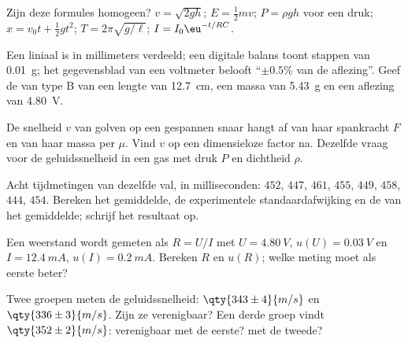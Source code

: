 \begin{exercise}[$\star$]\label{exo:b1:units-dimensions:3}
Zijn deze formules homogeen? $v = \sqrt{2gh}$;
$E = \tfrac12 m v$; $P = \rho g h$ voor een druk; $x = v_0 t +
\tfrac12 g t^2$; $T = 2\pi\sqrt{g/\ell}$; $I = I_0 \eu^{-t/RC}$.
\end{exercise}

\begin{exercise}[$\star$]\label{exo:b1:units-dimensions:4}
Een liniaal is in millimeters verdeeld; een digitale balans toont stappen van
\qty{0.01}{g}; het gegevensblad van een voltmeter belooft ``$\pm 0.5\%$ van
de aflezing''. Geef de  van type B van een lengte van
\qty{12.7}{cm}, een massa van \qty{5.43}{g} en een aflezing van \qty{4.80}{V}.
\end{exercise}

\begin{exercise}[$\star\star$]\label{exo:b1:units-dimensions:5}
De snelheid $v$ van golven op een gespannen snaar hangt af van haar spankracht
$F$ en van haar massa per  $\mu$. Vind $v$ op een dimensieloze
factor na. Dezelfde vraag voor de geluidssnelheid in een gas met druk $P$ en
dichtheid $\rho$.
\end{exercise}

\begin{exercise}[$\star\star$]\label{exo:b1:units-dimensions:6}
Acht tijdmetingen van dezelfde val, in milliseconden: $452$, $447$, $461$,
$455$, $449$, $458$, $444$, $454$. Bereken het gemiddelde, de experimentele
standaardafwijking en de  van het gemiddelde; schrijf het
resultaat op.
\end{exercise}

\begin{exercise}[$\star\star$]\label{exo:b1:units-dimensions:7}
Een weerstand wordt gemeten als $R = U/I$ met $U = \qty{4.80}{V}$,
$u(U) = \qty{0.03}{V}$ en $I = \qty{12.4}{mA}$, $u(I) = \qty{0.2}{mA}$.
Bereken $R$ en $u(R)$; welke meting moet als eerste beter?
\end{exercise}

\begin{exercise}[$\star\star$]\label{exo:b1:units-dimensions:8}
Twee groepen meten de geluidssnelheid: $\qty{343\pm4}{m/s}$ en
$\qty{336\pm3}{m/s}$. Zijn ze verenigbaar? Een derde groep vindt
$\qty{352\pm2}{m/s}$: verenigbaar met de eerste? met de tweede?
\end{exercise}

